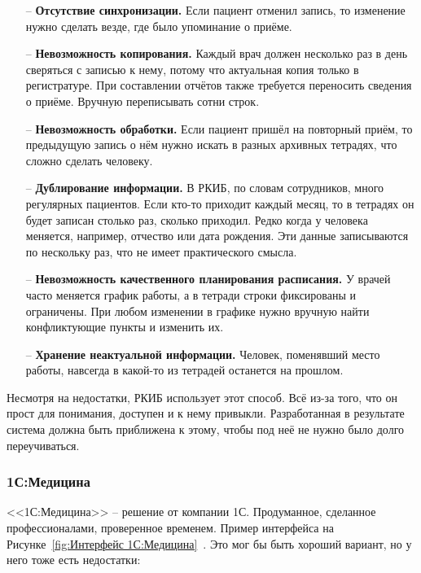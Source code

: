 \documentclass[a4paper,article]{article}
\begin{document}
\begin{sloppypar}
        \begin{itemize}[nolistsep]
            \item[--] \textbf{Отсутствие синхронизации.} Если пациент отменил запись, то изменение нужно сделать везде, где было упоминание о приёме.
            \item[--] \textbf{Невозможность копирования.} Каждый врач должен несколько раз в день сверяться с записью к нему, потому что актуальная копия только в регистратуре. При составлении отчётов также требуется переносить сведения о приёме. Вручную переписывать сотни строк.
            \item[--] \textbf{Невозможность обработки.} Если пациент пришёл на повторный приём, то предыдущую запись о нём нужно искать в разных архивных тетрадях, что сложно сделать человеку.
            \item[--] \textbf{Дублирование информации.} В РКИБ, по словам сотрудников, много регулярных пациентов. Если кто-то приходит каждый месяц, то в тетрадях он будет записан столько раз, сколько приходил. Редко когда у человека меняется, например, отчество или дата рождения. Эти данные записываются по нескольку раз, что не имеет практического смысла.
            \item[--] \textbf{Невозможность качественного планирования расписания.} У врачей часто меняется график работы, а в тетради строки фиксированы и ограничены. При любом изменении в графике нужно вручную найти конфликтующие пункты и изменить их.
            \item[--] \textbf{Хранение неактуальной информации.} Человек, поменявший место работы, навсегда в какой-то из тетрадей останется на прошлом.
        \end{itemize}

        Несмотря на недостатки, РКИБ использует этот способ. Всё из-за того, что он прост для понимания, доступен и к нему привыкли. Разработанная в результате система должна быть приближена к этому, чтобы под неё не нужно было долго переучиваться.

    \subsubsection{1С:Медицина}

        <<1С:Медицина>> -- решение от компании 1С. Продуманное, сделанное профессионалами, проверенное временем. Пример интерфейса на Рисунке~\ref{fig:Интерфейс 1С:Медицина}~\cite{1cmedicine}. Это мог бы быть хороший вариант, но у него тоже есть недостатки:


\end{sloppypar}
\end{document}
